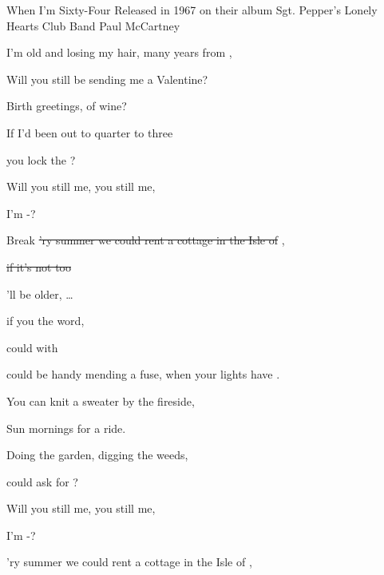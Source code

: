 \begin{SBSong}{When I'm Sixty-Four}
  {Released in 1967 on their album Sgt. Pepper's Lonely Hearts Club Band}
  {Paul McCartney}
  \begin{SBVerse}
     I'm old and losing my hair, many years from ,
    
    Will you still be sending me a Valentine?
    
    Birth greetings,  of wine?
    
    If I'd been out to quarter to three
    
     you lock the ?
    
    Will you still  me,  you still  me,
    
     I'm -?
  \end{SBVerse}
  \begin{SBBracket}{Break}
    \sout{'ry summer we could rent a cottage in the Isle of },
    
    \sout{if it's not too }
  
    'll be older,  \dots
    
     if you  the word,
    
     could  with  
  \end{SBBracket}
%  
  \begin{SBVerse}
     could be handy mending a fuse, when your lights have .
    
    You can knit a sweater by the fireside,
    
    Sun mornings  for a ride.
    
    Doing the garden, digging the weeds,
    
     could ask for ?
    
    Will you still  me,  you still  me,
    
     I'm -?
  \end{SBVerse}
  \CBPageBrk
  \begin{SBVerse}
    'ry summer we could rent a cottage in the Isle of ,
    

\end{SBVerse}
\end{SBSong}
